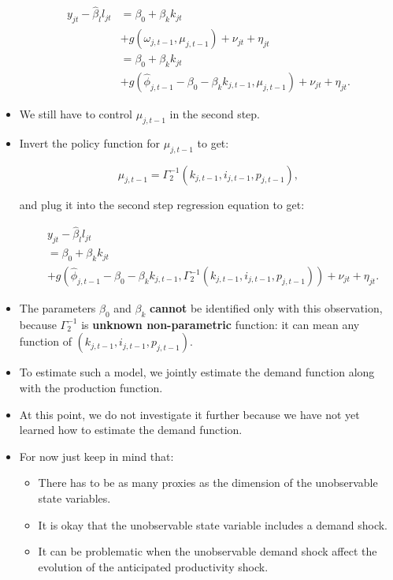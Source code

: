 \documentclass[]{book}
\providecommand{\tightlist}{%
  \setlength{\itemsep}{0pt}\setlength{\parskip}{0pt}}
\begin{document}
\begin{itemize}
  \begin{equation}
  \begin{split}
  y_{jt} - \hat{\beta}_l l_{jt} 
  &= \beta_0 + \beta_k k_{jt}\\
  & + g(\omega_{j, t - 1}, \mu_{j, t - 1}) + \nu_{jt} + \eta_{jt}\\
  &= \beta_0 + \beta_k k_{jt}\\
  & + g(\hat{\phi}_{j, t - 1} - \beta_0 - \beta_k k_{j, t - 1}, \mu_{j, t - 1}) + \nu_{jt} + \eta_{jt}.
  \end{split}
  \end{equation}
\item
  We still have to control \(\mu_{j, t - 1}\) in the second step.
\item
  Invert the policy function for \(\mu_{j, t - 1}\) to get:

  \begin{equation}
  \mu_{j, t - 1} = \Gamma_2^{- 1}(k_{j, t - 1}, i_{j, t - 1}, p_{j, t - 1}),
  \end{equation}

  and plug it into the second step regression equation to get:

  \begin{equation}
  \begin{split}
  &y_{jt} - \hat{\beta}_l l_{jt}\\
  &= \beta_0 + \beta_k k_{jt}\\
  &+g(\hat{\phi}_{j, t - 1} - \beta_0 - \beta_k k_{j, t - 1}, \Gamma_2^{- 1}(k_{j, t - 1}, i_{j, t - 1}, p_{j, t - 1})) + \nu_{jt} + \eta_{jt}.
  \end{split}
  \end{equation}
\item
  The parameters \(\beta_0\) and \(\beta_k\) \textbf{cannot} be
  identified only with this observation, because \(\Gamma_2^{-1}\) is
  \textbf{unknown non-parametric} function: it can mean any function of
  \((k_{j, t - 1}, i_{j, t - 1}, p_{j, t - 1})\).
\item
  To estimate such a model, we jointly estimate the demand function
  along with the production function.
\item
  At this point, we do not investigate it further because we have not
  yet learned how to estimate the demand function.
\item
  For now just keep in mind that:

  \begin{itemize}
  \tightlist
  \item
    There has to be as many proxies as the dimension of the unobservable
    state variables.
  \item
    It is okay that the unobservable state variable includes a demand
    shock.
  \item
    It can be problematic when the unobservable demand shock affect the
    evolution of the anticipated productivity shock.
  \end{itemize}
\end{itemize}
\end{document}
